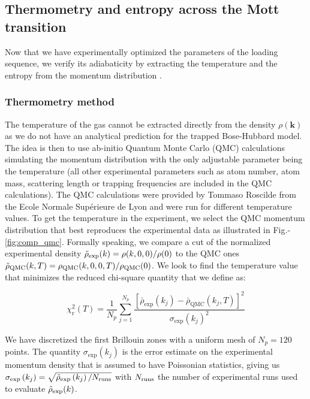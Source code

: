 \subsection{Thermometry and entropy across the Mott transition}

Now that we have experimentally optimized the parameters of the loading sequence, we verify its adiabaticity by extracting the temperature and the entropy from the momentum distribution \cite{carcy2021}.

\subsubsection{Thermometry method}

The temperature of the gas cannot be extracted directly from the density $\rho(\bm{k})$ as we do not have an analytical prediction for the trapped Bose-Hubbard model. The idea is then to use ab-initio Quantum Monte Carlo (QMC) calculations simulating the momentum distribution with the only adjustable parameter being the temperature (all other experimental parameters such as atom number, atom mass, scattering length or trapping frequencies are included in the QMC calculations). The QMC calculations were provided by Tommaso Roscilde from the Ecole Normale Supérieure de Lyon and were run for different temperature values. To get the temperature in the experiment, we select the QMC momentum distribution that best reproduces the experimental data  as illustrated in Fig.-\ref{fig:comp_qmc}. Formally speaking, we compare a cut of the normalized experimental density $\tilde{\rho}_{\rm{exp}}(k)=\rho(k,0,0)/\rho(0)$ to the QMC ones $\tilde{\rho}_{\rm{QMC}}(k,T)=\rho_{\rm{QMC}}(k,0,0,T)/\rho_{\rm{QMC}}(0)$. We look to find the temperature value that minimizes the reduced chi-square quantity that we define as:

\begin{equation}
    \chi_{\mathrm{r}}^{2}(T)=\frac{1}{N_{p}} \sum_{j=1}^{N_{p}} \frac{\left[\bar{\rho}_{\mathrm{exp}}\left(k_{j}\right)-\bar{\rho}_{\mathrm{QMC}}\left(k_{j}, T\right)\right]^{2}}{\sigma_{\exp }\left(k_{j}\right)^{2}}
\end{equation}

\noindent We have discretized the first Brillouin zones with a uniform mesh of $N_p=120$ points. The quantity $\sigma_{\exp }\left(k_{j}\right)$ is the error estimate on the experimental momentum density that is assumed to have Poissonian statistics, giving us $\sigma_{\exp }\left(k_{j}\right)=\sqrt{\tilde{\rho}_{\exp }\left(k_{j}\right) / N_{\rm{runs}}}$ with $N_{\rm{runs}}$ the number of experimental runs used to evaluate $\tilde{\rho}_{\rm{exp}}(k)$.


